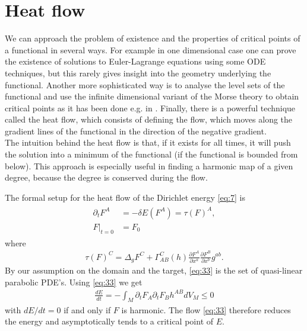 \section{Heat flow}
\label{sec:gradient-flow}

We can approach the problem of existence and the properties of
critical points of a functional in several ways. For example in one
dimensional case one can prove the existence of solutions to
Euler-Lagrange equations using some ODE techniques, but this rarely
gives insight into the geometry underlying the functional. Another
more sophisticated way is to analyse the level sets of the functional
and use the infinite dimensional variant of the Morse theory to obtain
critical points as it has been done e.g. in
\cite{Corlette2001}. Finally, there is a powerful technique called the
heat flow, which consists of defining the flow, which moves along
the gradient lines of the functional in the direction of
the negative gradient. \\

The intuition behind the heat flow is that, if it exists for all
times, it will push the solution into a minimum of the functional (if
the functional is bounded from below). This approach is especially
useful in finding a harmonic map of a given degree, because the degree
is conserved during the flow.

The formal setup for the heat flow of the Dirichlet energy
\eqref{eq:7} is
\begin{align}
  \label{eq:33}
    \begin{split}
    \partial_t F^A&=-\delta E(F^A)=\tau(F)^A,\\
    F\big|_{t=0}&=F_0
  \end{split}
\end{align}
where
\begin{align}
  \label{eq:34}
  \tau(F)^C=\Delta_g F^C+\Gamma_{AB}^{C}(h)\frac{\partial
    F^A}{\partial x^a}\frac{\partial F^B}{\partial x^b}g^{ab}.
\end{align}
By our assumption on the domain and the target, \eqref{eq:33} is the
set of quasi-linear parabolic PDE's. Using \eqref{eq:33} we get
\begin{align}
  \label{eq:35}
  \frac{dE}{dt}=-\int_M \partial_t F_A\partial_t F_B h^{AB}
  dV_M\le0
\end{align}
with $dE/dt=0$ if and only if $F$ is harmonic. The flow \eqref{eq:33}
therefore reduces the energy and asymptotically tends to a
critical point of $E$.\\

